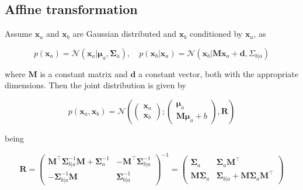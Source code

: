 \begin{appendices}
  \subsection{Affine transformation}

  \begin{theorem}

    Assume $\mathbf{x}_a$ and $\mathbf{x}_b$ are Gaussian distributed and $\mathbf{x}_b$ conditioned by $\mathbf{x}_a$, as

    \begin{equation}
    p\left(\mathbf{x}_{a}\right) =\mathcal{N}\left(\mathbf{x}_{a} | \boldsymbol{\mu}_{a}, \boldsymbol{\Sigma}_{a}\right), \quad p\left(\mathbf{x}_{b} | \mathbf{x}_{a}\right) =\mathcal{N}\left(\mathbf{x}_{b} | \mathbf{M} \mathbf{x}_{a}+\mathbf{d}, \Sigma_{b | a}\right)
    \end{equation}

    where $\mathbf{M}$ is a constant matrix and $\mathbf{d}$ a constant vector, both with the appropriate dimensions. Then the joint distribution is given by

    \begin{equation}
    p\left(\mathbf{x}_{a}, \mathbf{x}_{b}\right)=\mathcal{N}\left(\left(\begin{array}{c}{\mathbf{x}_{a}} \\ {\mathbf{x}_{b}}\end{array}\right) ;\left(\begin{array}{c}{\boldsymbol{\mu}_{a}} \\ {\mathbf{M} \boldsymbol{\mu}_{a}+b}\end{array}\right), \mathbf{R}\right)
    \end{equation}

    being

    \begin{equation}
    \mathbf{R}=\left(\begin{array}{cc}{\mathbf{M}^\top \boldsymbol{\Sigma}_{b | a}^{-1} \mathbf{M}+\boldsymbol{\Sigma}_{a}^{-1}} & {-\mathbf{M}^\top \boldsymbol{\Sigma}_{b | a}^{-1}} \\ {-\boldsymbol{\Sigma}_{b | a}^{-1} \mathbf{M}} & {\boldsymbol{\Sigma}_{b | a}^{-1}}\end{array}\right)^{-1}=\left(\begin{array}{cc}{\boldsymbol{\Sigma}_{a}} & {\boldsymbol{\Sigma}_{a} \mathbf{M}^\top} \\ {\mathbf{M} \boldsymbol{\Sigma}_{a}} & {\boldsymbol{\Sigma}_{b | a}+\mathbf{M} \boldsymbol{\Sigma}_{a} \mathbf{M}^\top}\end{array}\right)
    \end{equation}
    
  \end{theorem}

\end{appendices}